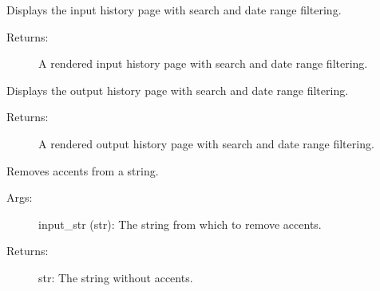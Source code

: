 \documentclass[letterpaper,10pt,english]{sphinxmanual}
\begin{document}
\begin{fulllineitems}
\label{\detokenize{modules/views:OutputHistory.views.inputHistory}}
\sphinxAtStartPar
Displays the input history page with search and date range filtering.
\begin{description}
\item[{Returns:}] \leavevmode
\sphinxAtStartPar
A rendered input history page with search and date range filtering.

\end{description}

\end{fulllineitems}


\begin{fulllineitems}
\label{\detokenize{modules/views:OutputHistory.views.outputHistory}}
\sphinxAtStartPar
Displays the output history page with search and date range filtering.
\begin{description}
\item[{Returns:}] \leavevmode
\sphinxAtStartPar
A rendered output history page with search and date range filtering.

\end{description}

\end{fulllineitems}


\begin{fulllineitems}
\label{\detokenize{modules/views:OutputHistory.views.remove_accents}}
\sphinxAtStartPar
Removes accents from a string.
\begin{description}
\item[{Args:}] \leavevmode
\sphinxAtStartPar
input\_str (str): The string from which to remove accents.

\item[{Returns:}] \leavevmode
\sphinxAtStartPar
str: The string without accents.

\end{description}

\end{fulllineitems}
\end{document}
